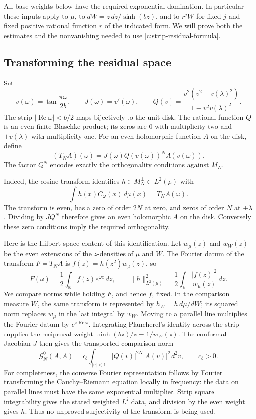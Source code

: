 All base weights below have the required exponential domination.  In
particular these inputs apply to $\mu$, to
$dW=z\,dz/\sinh(bz)$, and to $r^jW$ for fixed $j$ and fixed positive
rational function $r$ of the indicated form.  We will prove both the estimates and the nonvanishing
needed to use \eqref{c:strip-residual-formula}.

\subsection{Transforming the residual space}

Set
\[
 v(\omega)=\tan\frac{\pi\omega}{2b},\qquad
 J(\omega)=v'(\omega),\qquad
 Q(v)=\frac{v^2(v^2-v(\lambda)^2)}{1-v^2v(\lambda)^2}.
\]
The strip $|\operatorname{Re}\omega|<b/2$ maps bijectively to the unit
disk.  The rational function $Q$ is an even finite Blaschke product;
its zeros are $0$ with multiplicity two and $\pm v(\lambda)$ with
multiplicity one.  For an even holomorphic function $A$ on the disk,
define
\[
 (T_NA)(\omega)=J(\omega)Q(v(\omega))^N A(v(\omega)).
\]
The factor $Q^N$ encodes exactly the orthogonality conditions against
$M_N$.

Indeed, the cosine transform identifies $h\in M_N^\perp\subset
L^2(\mu)$ with
\begin{equation}\label{c:residual-transform}
 \int h(x)C_\omega(x)\,d\mu(x)=T_NA(\omega).
\end{equation}
The transform is even, has a zero of order $2N$ at zero, and zeros of
order $N$ at $\pm\lambda$.  Dividing by $JQ^N$ therefore gives an
even holomorphic $A$ on the disk.  Conversely these zero conditions
imply the required orthogonality.

Here is the Hilbert-space content of this identification.  Let
$w_\mu(z)$ and $w_W(z)$ be the even extensions of the $z$-densities of
$\mu$ and $W$.  The Fourier datum of the transform $F=T_NA$ is
$f(z)=h(z^2)w_\mu(z)$, so
\[
 F(\omega)=\frac12\int_{\mathbb R}f(z)e^{\omega z}\,dz,
 \qquad
 \|h\|_{L^2(\mu)}^2
 =\frac12\int_{\mathbb R}\frac{|f(z)|^2}{w_\mu(z)}\,dz.
\]
We compare norms while holding $F$, and hence $f$, fixed.  In the
comparison measure $W$, the same transform is represented by
$h_W=h\,d\mu/dW$; its squared norm replaces $w_\mu$ in the last
integral by $w_W$.  Moving to a parallel line multiplies the Fourier
datum by $e^{z\operatorname{Re}\omega}$.  Integrating Plancherel's
identity across the strip supplies the reciprocal weight
$\sinh(bz)/z=1/w_W(z)$.  The conformal Jacobian $J$ then gives the
transported comparison norm
\begin{equation}\label{c:model-norm}
 \mathcal G_N^0(A,A)
 =c_b\int_{|v|<1}|Q(v)|^{2N}|A(v)|^2\,d^2v,
 \qquad c_b>0.
\end{equation}
For completeness, the converse Fourier representation follows by
Fourier transforming the Cauchy--Riemann equation locally in frequency:
the data on parallel lines must have the same exponential multiplier.
Strip square integrability gives the stated weighted $L^2$ data, and
division by the even weight gives $h$.  Thus no unproved surjectivity
of the transform is being used.

